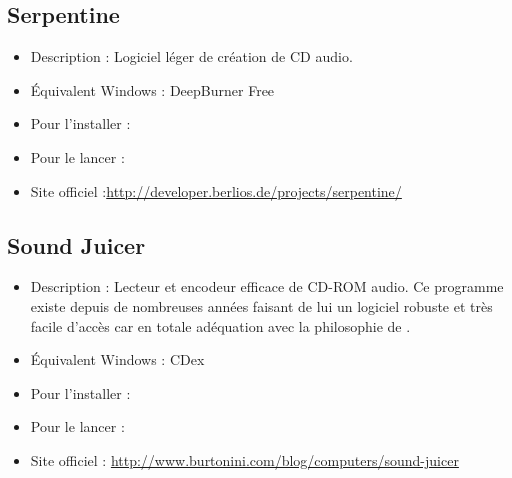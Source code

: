 \subsection{Serpentine}
\begin{itemize}
\begingroup
{}
\item Description : Logiciel léger de création de CD audio.{\par}
\item Équivalent Windows : DeepBurner Free{\par}
\item Pour l'installer : 
\item Pour le lancer : 
\item Site officiel :\url{http://developer.berlios.de/projects/serpentine/}{\par}
\endgroup
\end{itemize}
\subsection{Sound Juicer}
\begin{itemize}
\begingroup
{}
\item Description : Lecteur et encodeur efficace de CD-ROM audio. Ce programme existe depuis de nombreuses années faisant de lui un logiciel robuste et très facile d'accès car en totale adéquation avec la philosophie de .{\par}
\item Équivalent Windows : CDex{\par}
\item Pour l'installer : 
\item Pour le lancer : 
\endgroup
\item Site officiel : \url{http://www.burtonini.com/blog/computers/sound-juicer}{\par}
\end{itemize}

